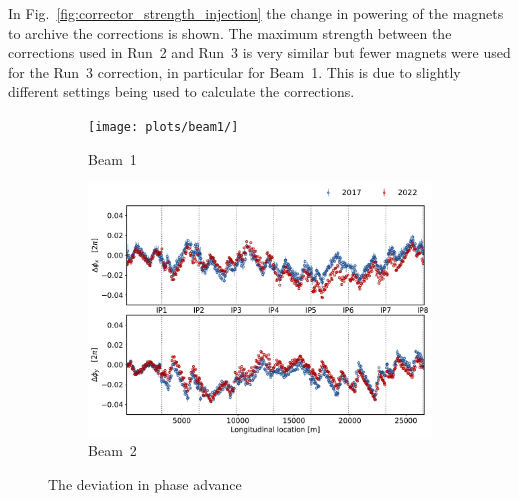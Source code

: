 \documentclass[a4paper]{cernatsnote}
\begin{document}
In Fig.~\ref{fig:corrector_strength_injection} the change in powering of the magnets to archive the corrections is shown. The maximum strength between the corrections used in Run~2 and Run~3 is very similar but fewer magnets were used for the Run~3 correction, in particular for Beam~1. This is due to slightly different settings being used to calculate the corrections.  

\begin{figure}[ht]
\begin{subfigure}{.5\textwidth}
  \centering
  \texttt{[image: plots/beam1/]}  
  \caption{Beam~1}
\end{subfigure}
\begin{subfigure}{.5\textwidth}
  \centering
  \includegraphics[width=.99\linewidth]{plots/beam2/total_phase_after_corr_2017_vs_2021_beam2.pdf}  
  \caption{Beam~2}
\end{subfigure}
\caption{The deviation in phase advance}
\label{fig:2016_disp_vs_2021}
\end{figure}
\end{document}
